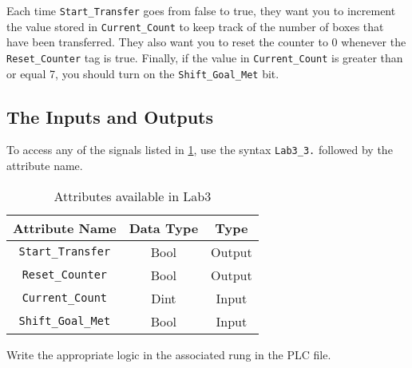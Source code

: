 Each time \verb|Start_Transfer| goes from false to true, they want you to increment the value stored in \verb|Current_Count| to keep track of the number of boxes that have been transferred. They also want you to reset the counter to 0 whenever the \verb|Reset_Counter| tag is true. Finally, if the value in \verb|Current_Count| is greater than or equal 7, you should turn on the \verb|Shift_Goal_Met| bit.


\subsection{The Inputs and Outputs}


To access any of the signals listed in \tableautorefname \ref{Table:Lab3_3Attributes}, use the syntax \verb|Lab3_3.| followed by the attribute name. 

\begin{table}[h]
\centering
\caption{Attributes available in Lab3}
\label{Table:Lab3_3Attributes}
\begin{tabular}{c c c}
\toprule
Attribute Name & Data Type & Type\\
\midrule
\verb|Start_Transfer| & Bool & Output \\
\verb|Reset_Counter| & Bool & Output \\
\midrule
\verb|Current_Count| & Dint & Input\\
\verb|Shift_Goal_Met| & Bool & Input\\
\bottomrule
\end{tabular}
\end{table}

Write the appropriate logic in the associated rung in the PLC file.

\TASignatureSlot


